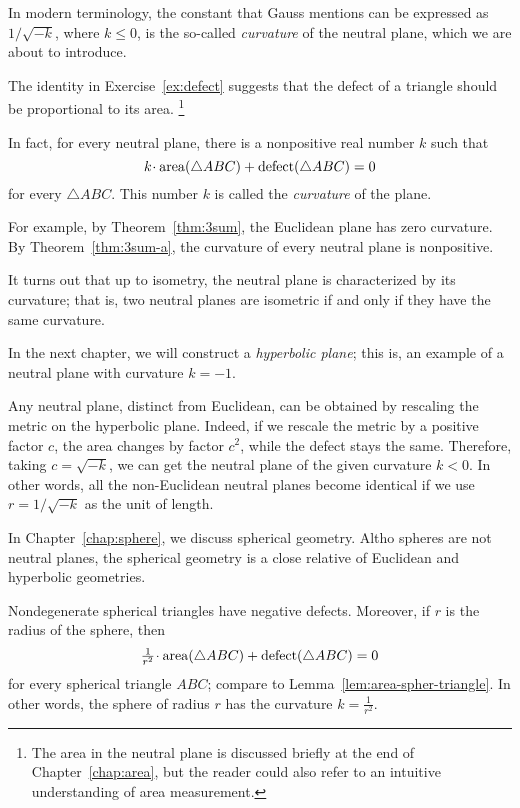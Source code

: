 In modern terminology, the constant that Gauss mentions 
can be expressed as $1/\sqrt{-k}$, 
where $k\le 0$, is the so-called \emph{curvature} of the neutral plane, which we are about to introduce.

The identity in Exercise~\ref{ex:defect} suggests that the defect of a triangle should be proportional to its area.%
\footnote{The area in the neutral plane is discussed briefly at the end of Chapter~\ref{chap:area},
but the reader could also refer to an intuitive understanding of area measurement.}

In fact, for every neutral plane, there is a nonpositive real number $k$
such that 
$$k\cdot\area(\triangle ABC)+\defect(\triangle ABC)=0$$
for every $\triangle ABC$.
This number $k$ is called the \emph{curvature} of the plane.

For example, by Theorem~\ref{thm:3sum}, the Euclidean plane has zero curvature.
By Theorem~\ref{thm:3sum-a}, the curvature of every neutral plane is nonpositive.

It turns out that up to isometry, the neutral plane is characterized by its curvature;
that is, two neutral planes are isometric if and only if they have the same curvature. 

In the next chapter, we will construct a {}\emph{hyperbolic plane};
this is, an example of a neutral plane with curvature $k=-1$.

Any neutral plane, distinct from Euclidean,
can be obtained by rescaling the metric on the hyperbolic plane.
Indeed,
if we rescale the metric by a positive factor $c$,
the area changes by factor $c^2$, while the defect stays the same.
Therefore, taking $c=\sqrt{-k}$,
we can get the neutral plane of the given curvature $k<0$.
In other words, all the non-Euclidean neutral planes become identical
if we use $r=1/\sqrt{-k}$ as the unit of length.

\medskip

In Chapter~\ref{chap:sphere}, we discuss spherical geometry.
Altho spheres are not neutral planes,
the spherical geometry is a close relative of Euclidean and hyperbolic geometries.

Nondegenerate spherical triangles have negative defects.
Moreover, 
if $r$ is the radius of the sphere, then
$$\tfrac1{r^2}\cdot\area(\triangle ABC)+\defect(\triangle ABC)=0$$
for every spherical triangle $ABC$; compare to Lemma~\ref{lem:area-spher-triangle}.
In other words, 
the sphere of radius $r$ has the curvature $k=\tfrac1{r^2}$.
